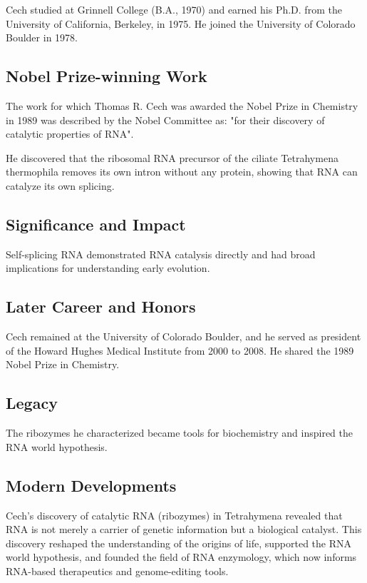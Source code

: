Cech studied at Grinnell College (B.A., 1970) and earned his Ph.D. from the University of California, Berkeley, in 1975. He joined the University of Colorado Boulder in 1978.

\subsection*{Nobel Prize-winning Work}

The work for which Thomas R. Cech was awarded the Nobel Prize in Chemistry in 1989 was described by the Nobel Committee as: "for their discovery of catalytic properties of RNA".

He discovered that the ribosomal RNA precursor of the ciliate Tetrahymena thermophila removes its own intron without any protein, showing that RNA can catalyze its own splicing.

\subsection*{Significance and Impact}

Self-splicing RNA demonstrated RNA catalysis directly and had broad implications for understanding early evolution.

\subsection*{Later Career and Honors}

Cech remained at the University of Colorado Boulder, and he served as president of the Howard Hughes Medical Institute from 2000 to 2008. He shared the 1989 Nobel Prize in Chemistry.

\subsection*{Legacy}

The ribozymes he characterized became tools for biochemistry and inspired the RNA world hypothesis.

\subsection*{Modern Developments}

Cech's discovery of catalytic RNA (ribozymes) in Tetrahymena revealed that RNA is not merely a carrier of genetic information but a biological catalyst. This discovery reshaped the understanding of the origins of life, supported the RNA world hypothesis, and founded the field of RNA enzymology, which now informs RNA-based therapeutics and genome-editing tools.

